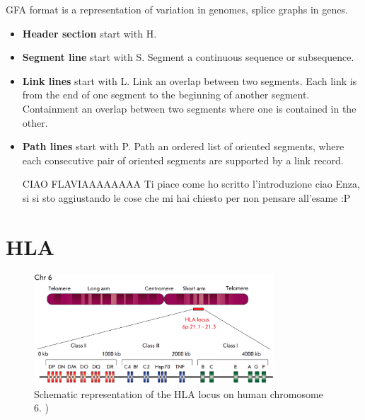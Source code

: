 

GFA format is a representation of variation in genomes, splice graphs in genes.





\begin{itemize}

\item\textbf{Header section} start with H.
\item\textbf{Segment line} start with S.
Segment a continuous sequence or subsequence.
\item\textbf{Link lines} start with L.
Link an overlap between two segments. Each link is from the end of one segment to the beginning of another segment. Containment an overlap between two segments where one is contained in the other.
\item\textbf{Path lines} start with P. 
Path an ordered list of oriented segments, where each consecutive pair of oriented segments are supported by a link record.





CIAO FLAVIAAAAAAAA 
Ti piace come ho scritto l'introduzione  ciao Enza, si si sto aggiustando le cose che mi hai chiesto per non pensare all'esame :P







\end{itemize}

\section{HLA}

\begin{figure}[H]
\centering
\includegraphics[width=0.80\textwidth]{fig/HLA_loci.png}
\decoRule
\caption{Schematic representation of the HLA locus on human chromosome 6. \cite{zakharova2019contribution})}
\label{fig:HLA.png}
\end{figure}




